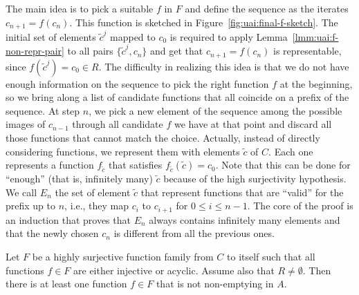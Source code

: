 The main idea is to pick a suitable $f$ in $F$ and define the sequence as the iterates $c_{n+1} = f(c_n)$. This function is sketched in Figure~\ref{fig:uai:final-f-sketch}.
The initial set of elements $\tilde{c}^j$ mapped to $c_0$ is required to apply Lemma~\ref{lmm:uai:f-non-repr-pair} to all pairs $\{ \tilde{c}^j, c_n \}$ and get that $c_{n+1} = f(c_n)$ is representable, since $f(\tilde{c}^j) = c_0 \in R$.
The difficulty in realizing this idea is that we do not have enough information on the sequence to pick the right function $f$ at the beginning, so we bring along a list of candidate functions that all coincide on a prefix of the sequence. At step $n$, we pick a new element of the sequence among the possible images of $c_{n-1}$ through all candidate $f$ we have at that point and discard all those functions that cannot match the choice.
Actually, instead of directly considering functions, we represent them with elements $\tilde{c}$ of $C$. Each one represents a function $f_{\tilde{c}}$ that satisfies $f_{\tilde{c}}(\tilde{c}) = c_0$. Note that this can be done for ``enough'' (that is, infinitely many) $\tilde{c}$ because of the high surjectivity hypothesis. We call $E_n$ the set of element $\tilde{c}$ that represent functions that are ``valid'' for the prefix up to $n$, i.e., they map $c_{i}$ to $c_{i+1}$ for $0 \le i \le n - 1$. The core of the proof is an induction that proves that $E_n$ always contains infinitely many elements and that the newly chosen $c_n$ is different from all the previous ones.
\begin{theorem}\label{th:uai:non-empt-res-local}
	Let $F$ be a highly surjective function family from $C$ to itself such that all functions $f \in F$ are either injective or acyclic.
	Assume also that $R\neq \emptyset$. Then there is at least one function $f \in F$ that is not non-emptying in $A$.
\end{theorem}

